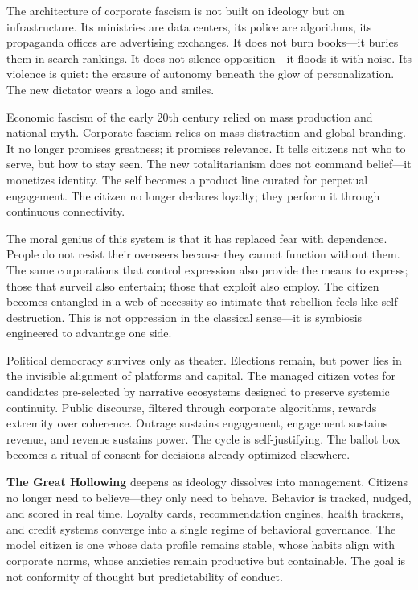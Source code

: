 \documentclass[11pt,twoside]{book}
\begin{document}
The architecture of corporate fascism is not built on ideology but on infrastructure.  Its ministries are data centers, its police are algorithms, its propaganda offices are advertising exchanges.  It does not burn books—it buries them in search rankings.  It does not silence opposition—it floods it with noise.  Its violence is quiet: the erasure of autonomy beneath the glow of personalization.  The new dictator wears a logo and smiles.

Economic fascism of the early 20th century relied on mass production and national myth.  Corporate fascism relies on mass distraction and global branding.  It no longer promises greatness; it promises relevance.  It tells citizens not who to serve, but how to stay seen.  The new totalitarianism does not command belief—it monetizes identity.  The self becomes a product line curated for perpetual engagement.  The citizen no longer declares loyalty; they perform it through continuous connectivity.

The moral genius of this system is that it has replaced fear with dependence.  People do not resist their overseers because they cannot function without them.  The same corporations that control expression also provide the means to express; those that surveil also entertain; those that exploit also employ.  The citizen becomes entangled in a web of necessity so intimate that rebellion feels like self-destruction.  This is not oppression in the classical sense—it is symbiosis engineered to advantage one side.

Political democracy survives only as theater.  Elections remain, but power lies in the invisible alignment of platforms and capital.  The managed citizen votes for candidates pre-selected by narrative ecosystems designed to preserve systemic continuity.  Public discourse, filtered through corporate algorithms, rewards extremity over coherence.  Outrage sustains engagement, engagement sustains revenue, and revenue sustains power.  The cycle is self-justifying.  The ballot box becomes a ritual of consent for decisions already optimized elsewhere.

\textbf{The Great Hollowing} deepens as ideology dissolves into management.  Citizens no longer need to believe—they only need to behave.  Behavior is tracked, nudged, and scored in real time.  Loyalty cards, recommendation engines, health trackers, and credit systems converge into a single regime of behavioral governance.  The model citizen is one whose data profile remains stable, whose habits align with corporate norms, whose anxieties remain productive but containable.  The goal is not conformity of thought but predictability of conduct.
\end{document}
